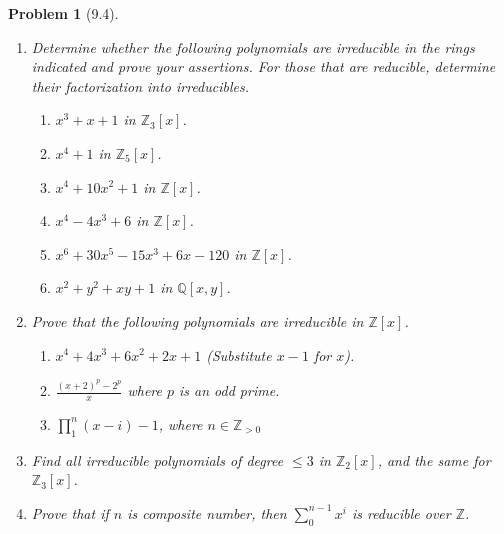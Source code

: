 \documentclass[10pt]{article}
\newcommand{\bb}[1]{\mathbb{#1}}
\theoremstyle{plain}
\newtheorem{problem}{Problem}
\theoremstyle{remark}
\begin{document}
\begin{problem}[9.4]
  \begin{enumerate}
  \item Determine whether the following polynomials are irreducible in
    the rings indicated and prove your assertions. For those that are reducible,
    determine their factorization into irreducibles.
    \begin{enumerate}
    \item $x^3+x+1$ in $\bb{Z}_3[x]$.
    \item $x^4+1$ in $\bb{Z}_5[x]$.
    \item $x^4+10x^2+1$ in $\bb{Z}[x]$.
    \item $x^4-4x^3+6$ in $\bb{Z}[x]$.
    \item $x^6+30x^5-15x^3+6x-120$ in $\bb{Z}[x]$.
    \item $x^2+y^2+xy+1$ in $\bb{Q}[x,y]$.
    \end{enumerate}
  \item Prove that the following polynomials are irreducible in $\bb{Z}[x]$.
    \begin{enumerate}
    \item $x^4+4x^3+6x^2+2x+1$ (Substitute $x-1$ for $x$).
    \item $\frac{(x+2)^p-2^p}{x}$ where $p$ is an odd prime.
    \item $\prod_1^n(x-i) - 1$, where $n\in\bb{Z}_{>0}$
    \end{enumerate}
  \item Find all irreducible polynomials of degree $\leq 3$ in $\bb{Z}_2[x]$,
    and the same for $\bb{Z}_3[x]$.
  \item Prove that if $n$ is composite number, then $\sum_0^{n-1}x^{i}$ is
    reducible over $\bb{Z}$.
  \end{enumerate}
\end{problem}
\end{document}
